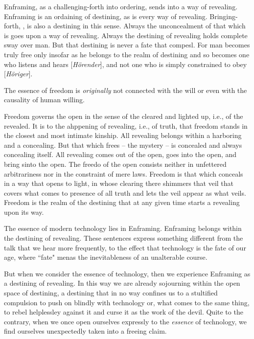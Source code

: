 Enframing, as a challenging-forth into ordering, sends into a way of revealing. Enframing is an ordaining of destining, as is every way of revealing. Bringing-forth, , is also a destining in this sense. Always the unconcealment of that which is goes upon a way of revealing. Always the destining of revealing holds complete sway over man. But that destining is never a fate that compesl. For man becomes truly free only insofar as he belongs to the realm of destining and so becomes one who listens and hears [\textit{H\"{o}render}], and not one who is simply constrained to obey [\textit{H\"{o}riger}].

The essence of freedom is \textit{originally} not connected with the will or even with the causality of human willing.

Freedom governs the open in the sense of the cleared and lighted up, i.e., of the revealed. It is to the ahppening of revealing, i.e., of truth, that freedom stands in the closest and most intimate kinship. All revealing belongs within a harboring and a concealing. But that which frees -- the mystery -- is concealed and always concealing itself. All revealing comes out of the open, goes into the open, and bring sinto the open. The freedo of the open consists neither in unfettered arbitrariness nor in the constraint of mere laws. Freedom is that which conceals in a way that opens to light, in whose clearing there shimmers that veil that covers what comes to presence of all truth and lets the veil appear as what veils. Freedom is the realm of the destining that at any given time starts a revealing upon its way.

The essence of modern technology lies in Enframing. Enframing belongs within the destining of revealing. These sentences express something different from the talk that we hear more frequently, to the effect that technology is the fate of our age, where ``fate" menas the inevitableness of an unalterable course.

But when we consider the essence of technology, then we experience Enframing as a destining of revealing. In this way we are already sojourning within the open space of destining, a destining that in no way confines us to a stultified compulsion to push on blindly with technology or, what comes to the same thing, to rebel helplessley against it and curse it as the work of the devil. Quite to the contrary, when we once open ourselves expressly to the \textit{essence} of technology, we find ourselves unexpectedly taken into a freeing claim.

